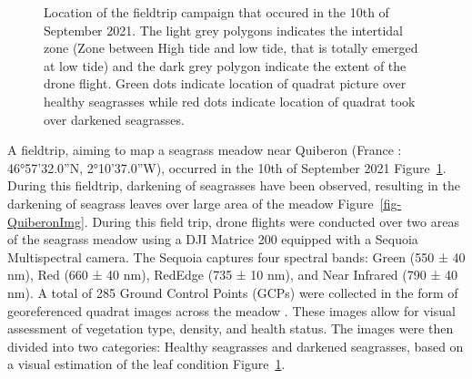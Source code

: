 \documentclass[
  number]{elsarticle}
\begin{document}
\label{cell-fig-quiberonMap}
\begin{figure}[H]


\caption{\label{fig-quiberonMap}Location of the fieldtrip campaign that
occured in the 10th of September 2021. The light grey polygons indicates
the intertidal zone (Zone between High tide and low tide, that is
totally emerged at low tide) and the dark grey polygon indicate the
extent of the drone flight. Green dots indicate location of quadrat
picture over healthy seagrasses while red dots indicate location of
quadrat took over darkened seagrasses.}

\end{figure}%

A fieldtrip, aiming to map a seagrass meadow near Quiberon (France :
46°57'32.0''N, 2°10'37.0''W), occurred in the 10th of September 2021
Figure~\ref{fig-quiberonMap}. During this fieldtrip, darkening of
seagrasses have been observed, resulting in the darkening of seagrass
leaves over large area of the meadow Figure~\ref{fig-QuiberonImg}.
During this field trip, drone flights were conducted over two areas of
the seagrass meadow using a DJI Matrice 200 equipped with a Sequoia
Multispectral camera. The Sequoia captures four spectral bands: Green
(550 ± 40 nm), Red (660 ± 40 nm), RedEdge (735 ± 10 nm), and Near
Infrared (790 ± 40 nm). A total of 285 Ground Control Points (GCPs) were
collected in the form of georeferenced quadrat images across the meadow
. These images allow for visual assessment of vegetation type, density,
and health status. The images were then divided into two categories:
Healthy seagrasses and darkened seagrasses, based on a visual estimation
of the leaf condition Figure~\ref{fig-quiberonMap}.
\end{document}
